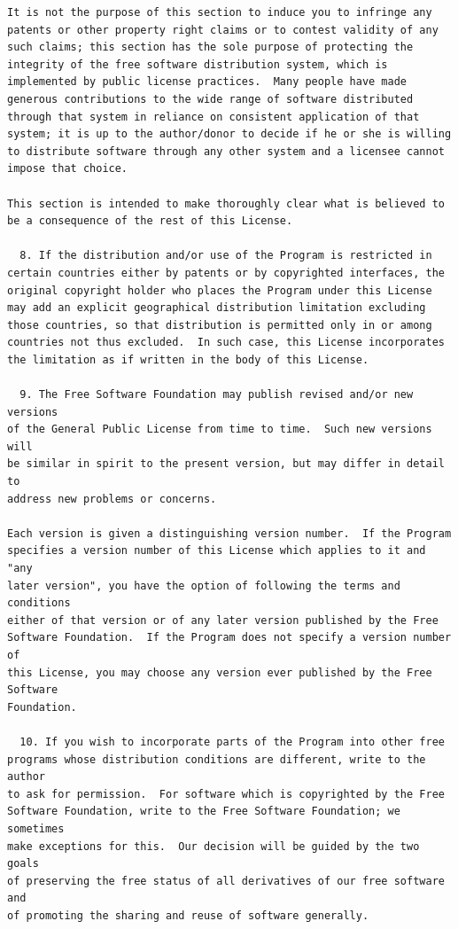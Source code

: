 \documentclass[a4paper,BCOR30mm,DIV14,pdftex,liststotoc,footsepline,openany]{scrbook}
\begin{document}
\begin{verbatim}
It is not the purpose of this section to induce you to infringe any
patents or other property right claims or to contest validity of any
such claims; this section has the sole purpose of protecting the
integrity of the free software distribution system, which is
implemented by public license practices.  Many people have made
generous contributions to the wide range of software distributed
through that system in reliance on consistent application of that
system; it is up to the author/donor to decide if he or she is willing
to distribute software through any other system and a licensee cannot
impose that choice.

This section is intended to make thoroughly clear what is believed to
be a consequence of the rest of this License.

  8. If the distribution and/or use of the Program is restricted in
certain countries either by patents or by copyrighted interfaces, the
original copyright holder who places the Program under this License
may add an explicit geographical distribution limitation excluding
those countries, so that distribution is permitted only in or among
countries not thus excluded.  In such case, this License incorporates
the limitation as if written in the body of this License.

  9. The Free Software Foundation may publish revised and/or new versions
of the General Public License from time to time.  Such new versions will
be similar in spirit to the present version, but may differ in detail to
address new problems or concerns.

Each version is given a distinguishing version number.  If the Program
specifies a version number of this License which applies to it and "any
later version", you have the option of following the terms and conditions
either of that version or of any later version published by the Free
Software Foundation.  If the Program does not specify a version number of
this License, you may choose any version ever published by the Free Software
Foundation.

  10. If you wish to incorporate parts of the Program into other free
programs whose distribution conditions are different, write to the author
to ask for permission.  For software which is copyrighted by the Free
Software Foundation, write to the Free Software Foundation; we sometimes
make exceptions for this.  Our decision will be guided by the two goals
of preserving the free status of all derivatives of our free software and
of promoting the sharing and reuse of software generally.


\end{verbatim}
\end{document}
